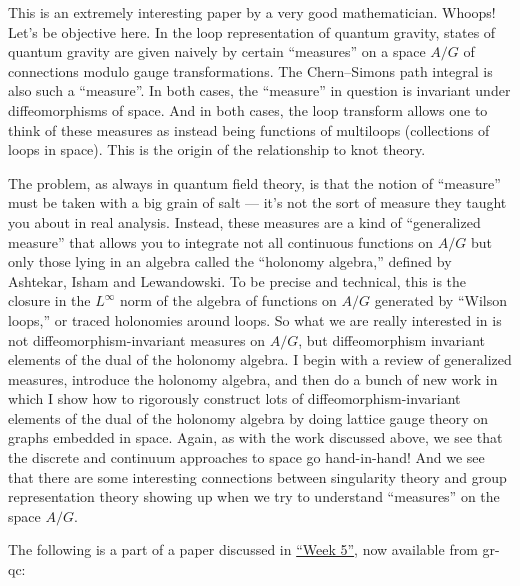 \documentclass[12pt]{article}
\def\tightlist{}
\renewcommand{\texttt}[1]{%
  \begingroup
  \ttfamily
  \begingroup\lccode`~=`/\lowercase{\endgroup\def~}{/\discretionary{}{}{}}%
  \begingroup\lccode`~=`[\lowercase{\endgroup\def~}{[\discretionary{}{}{}}%
  \begingroup\lccode`~=`.\lowercase{\endgroup\def~}{.\discretionary{}{}{}}%
  \catcode`/=\active\catcode`[=\active\catcode`.=\active
  \scantokens{#1\noexpand}%
  \endgroup
}
\begin{document}
This is an extremely interesting paper by a very good mathematician.
Whoops! Let's be objective here. In the loop representation of quantum
gravity, states of quantum gravity are given naively by certain
``measures'' on a space \(A/G\) of connections modulo gauge
transformations. The Chern--Simons path integral is also such a
``measure''. In both cases, the ``measure'' in question is invariant
under diffeomorphisms of space. And in both cases, the loop transform
allows one to think of these measures as instead being functions of
multiloops (collections of loops in space). This is the origin of the
relationship to knot theory.

The problem, as always in quantum field theory, is that the notion of
``measure'' must be taken with a big grain of salt --- it's not the sort
of measure they taught you about in real analysis. Instead, these
measures are a kind of ``generalized measure'' that allows you to
integrate not all continuous functions on \(A/G\) but only those lying
in an algebra called the ``holonomy algebra,'' defined by Ashtekar,
Isham and Lewandowski. To be precise and technical, this is the closure
in the \(L^\infty\) norm of the algebra of functions on \(A/G\)
generated by ``Wilson loops,'' or traced holonomies around loops. So
what we are really interested in is not diffeomorphism-invariant
measures on \(A/G\), but diffeomorphism invariant elements of the dual
of the holonomy algebra. I begin with a review of generalized measures,
introduce the holonomy algebra, and then do a bunch of new work in which
I show how to rigorously construct lots of diffeomorphism-invariant
elements of the dual of the holonomy algebra by doing lattice gauge
theory on graphs embedded in space. Again, as with the work discussed
above, we see that the discrete and continuum approaches to space go
hand-in-hand! And we see that there are some interesting connections
between singularity theory and group representation theory showing up
when we try to understand ``measures'' on the space \(A/G\).

The following is a part of a paper discussed in
\protect\hyperlink{week5}{``Week 5''}, now available from gr-qc:

\end{document}
